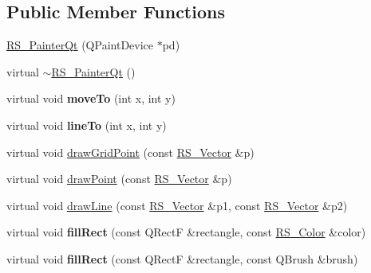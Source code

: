 \subsection*{Public Member Functions}
\begin{DoxyCompactItemize}
\item 
\hyperlink{classRS__PainterQt_a3555b630670321b1b130c5369c57b930}{R\-S\-\_\-\-Painter\-Qt} (Q\-Paint\-Device $\ast$pd)
\item 
virtual \hyperlink{classRS__PainterQt_afda8cf722b77143f23608e52f1655e66}{$\sim$\-R\-S\-\_\-\-Painter\-Qt} ()
\item 
\hypertarget{classRS__PainterQt_ac045128f8596246368dfc0ee66886a46}{virtual void {\bfseries move\-To} (int x, int y)}\label{classRS__PainterQt_ac045128f8596246368dfc0ee66886a46}

\item 
\hypertarget{classRS__PainterQt_a90812612d9a667e9466d28c027a77248}{virtual void {\bfseries line\-To} (int x, int y)}\label{classRS__PainterQt_a90812612d9a667e9466d28c027a77248}

\item 
virtual void \hyperlink{classRS__PainterQt_ae3b89a985ffd60d46f245f8a0c9e4016}{draw\-Grid\-Point} (const \hyperlink{classRS__Vector}{R\-S\-\_\-\-Vector} \&p)
\item 
virtual void \hyperlink{classRS__PainterQt_af581593246f8d64a4b2ce4ba83fb43eb}{draw\-Point} (const \hyperlink{classRS__Vector}{R\-S\-\_\-\-Vector} \&p)
\item 
virtual void \hyperlink{classRS__PainterQt_a2c39fe455f60d611a3c57c6543cdcdab}{draw\-Line} (const \hyperlink{classRS__Vector}{R\-S\-\_\-\-Vector} \&p1, const \hyperlink{classRS__Vector}{R\-S\-\_\-\-Vector} \&p2)
\item 
\hypertarget{classRS__PainterQt_a60666ad9f17bd6b83762e8006497fac2}{virtual void {\bfseries fill\-Rect} (const Q\-Rect\-F \&rectangle, const \hyperlink{classRS__Color}{R\-S\-\_\-\-Color} \&color)}\label{classRS__PainterQt_a60666ad9f17bd6b83762e8006497fac2}

\item 
\hypertarget{classRS__PainterQt_ade34037c71b66d8ce0306fa0c27bf025}{virtual void {\bfseries fill\-Rect} (const Q\-Rect\-F \&rectangle, const Q\-Brush \&brush)}\label{classRS__PainterQt_ade34037c71b66d8ce0306fa0c27bf025}


\end{DoxyCompactItemize}
